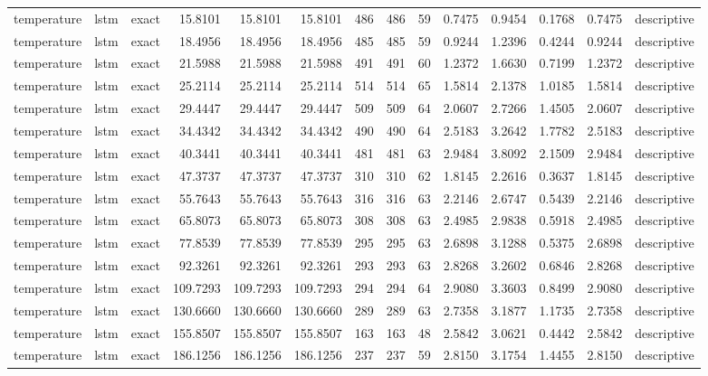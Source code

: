 \begin{tabular}{lllrrrrrrrrrrl}
temperature & lstm & exact & 15.8101 & 15.8101 & 15.8101 & 486 & 486 & 59 & 0.7475 & 0.9454 & 0.1768 & 0.7475 & descriptive \\
temperature & lstm & exact & 18.4956 & 18.4956 & 18.4956 & 485 & 485 & 59 & 0.9244 & 1.2396 & 0.4244 & 0.9244 & descriptive \\
temperature & lstm & exact & 21.5988 & 21.5988 & 21.5988 & 491 & 491 & 60 & 1.2372 & 1.6630 & 0.7199 & 1.2372 & descriptive \\
temperature & lstm & exact & 25.2114 & 25.2114 & 25.2114 & 514 & 514 & 65 & 1.5814 & 2.1378 & 1.0185 & 1.5814 & descriptive \\
temperature & lstm & exact & 29.4447 & 29.4447 & 29.4447 & 509 & 509 & 64 & 2.0607 & 2.7266 & 1.4505 & 2.0607 & descriptive \\
temperature & lstm & exact & 34.4342 & 34.4342 & 34.4342 & 490 & 490 & 64 & 2.5183 & 3.2642 & 1.7782 & 2.5183 & descriptive \\
temperature & lstm & exact & 40.3441 & 40.3441 & 40.3441 & 481 & 481 & 63 & 2.9484 & 3.8092 & 2.1509 & 2.9484 & descriptive \\
temperature & lstm & exact & 47.3737 & 47.3737 & 47.3737 & 310 & 310 & 62 & 1.8145 & 2.2616 & 0.3637 & 1.8145 & descriptive \\
temperature & lstm & exact & 55.7643 & 55.7643 & 55.7643 & 316 & 316 & 63 & 2.2146 & 2.6747 & 0.5439 & 2.2146 & descriptive \\
temperature & lstm & exact & 65.8073 & 65.8073 & 65.8073 & 308 & 308 & 63 & 2.4985 & 2.9838 & 0.5918 & 2.4985 & descriptive \\
temperature & lstm & exact & 77.8539 & 77.8539 & 77.8539 & 295 & 295 & 63 & 2.6898 & 3.1288 & 0.5375 & 2.6898 & descriptive \\
temperature & lstm & exact & 92.3261 & 92.3261 & 92.3261 & 293 & 293 & 63 & 2.8268 & 3.2602 & 0.6846 & 2.8268 & descriptive \\
temperature & lstm & exact & 109.7293 & 109.7293 & 109.7293 & 294 & 294 & 64 & 2.9080 & 3.3603 & 0.8499 & 2.9080 & descriptive \\
temperature & lstm & exact & 130.6660 & 130.6660 & 130.6660 & 289 & 289 & 63 & 2.7358 & 3.1877 & 1.1735 & 2.7358 & descriptive \\
temperature & lstm & exact & 155.8507 & 155.8507 & 155.8507 & 163 & 163 & 48 & 2.5842 & 3.0621 & 0.4442 & 2.5842 & descriptive \\
temperature & lstm & exact & 186.1256 & 186.1256 & 186.1256 & 237 & 237 & 59 & 2.8150 & 3.1754 & 1.4455 & 2.8150 & descriptive \\

\end{tabular}
